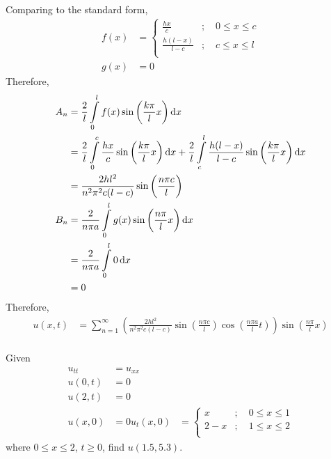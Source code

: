 \documentclass[titlepage, fleqn, a4paper, 12pt, twoside]{article}
\theoremstyle{definition}
\theoremstyle{theorem}
\begin{document}
\begin{solution}
	Comparing to the standard form,
	\begin{align*}
		f(x) &=
			\begin{cases}
				\frac{h x}{c}           & ;\quad 0 \le x \le c \\
				\frac{h (l - x)}{l - c} & ;\quad c \le x \le l \\
			\end{cases}\\
		g(x) &= 0
	\end{align*}
	Therefore,
	\begin{align*}
		A_n & = \frac{2}{l} \int\limits_{0}^{l} f(x) \sin\left( \frac{k \pi}{l} x \right) \dif x                                                                                                                \\
                    & = \frac{2}{l} \int\limits_{0}^{c} \frac{h x}{c} \sin\left( \frac{k \pi}{l} x \right) \dif x + \frac{2}{l} \int\limits_{c}^{l} \frac{h (l - x)}{l - c} \sin\left( \frac{k \pi}{l} x \right) \dif x \\
                    & = \frac{2 h l^2}{n^2 \pi^2 c (l - c)} \sin\left( \frac{n \pi c}{l} \right)                                                                                                                        \\
		B_n & = \frac{2}{n \pi a} \int\limits_{0}^{l} g(x) \sin\left( \frac{n \pi}{l} x \right) \dif x                                                                                                          \\
                    & = \frac{2}{n \pi a} \int\limits_{0}^{l} 0 \dif x                                                                                                                                                  \\
                    & = 0
	\end{align*}
	Therefore,
	\begin{align*}
		u(x,t) & = \sum\limits_{n = 1}^{\infty} \left( \frac{2 h l^2}{n^2 \pi^2 c (l - c)} \sin\left( \frac{n \pi c}{l} \right) \cos\left( \frac{n \pi a}{l} t \right) \right) \sin\left( \frac{n \pi}{l} x \right) \\
	\end{align*}
\end{solution}

\begin{question}
	Given
	\begin{align*}
		u_{t t} &= u_{x x}\\
		u(0,t) &= 0\\
		u(2,t) &= 0\\
		u(x,0) &= 0
		u_t(x,0) &=
			\begin{cases}
				x     & ;\quad 0 \le x \le 1 \\
				2 - x & ;\quad 1 \le x \le 2 \\
			\end{cases}
	\end{align*}
	where $0 \le x \le 2$, $t \ge 0$, find $u(1.5,5.3)$.
\end{question}
\end{document}
